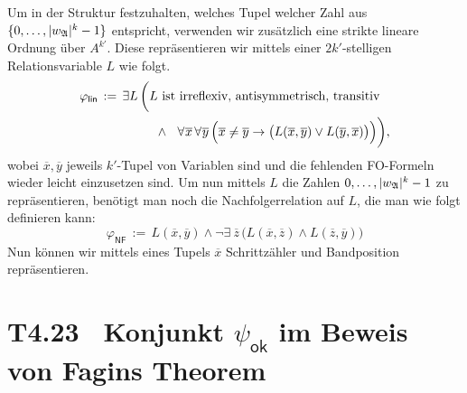 \documentclass[fontsize=11pt, twoside=false, numbers=autoenddot]{scrbook}
\begin{document}
Um in der Struktur festzuhalten, welches Tupel welcher Zahl aus $\{0,\dots,|w_\mathfrak{A}|^k-1\}$
entspricht,
verwenden wir zusätzlich eine strikte lineare Ordnung über $A^{k'}$.
Diese repräsentieren wir mittels einer $2k'$-stelligen Relationsvariable $L$ wie folgt.
%
\begin{align*}
  \varphi_{\textsf{lin}} & \,:=\, \exists L\,\bigg(L \text{~ist irreflexiv, antisymmetrisch, transitiv} \\
                         & \hspace*{16mm} \land~~ \forall\:\!\overline{x}\,\forall\:\!\overline{y}\,
                                          \Big(\overline{x} \neq \overline{y} \to \big(L(\overline{x},\overline{y}) \lor L(\overline{y},\overline{x})\big)\Big)\bigg),
\end{align*}
%
wobei $\overline{x},\overline{y}$ jeweils $k'$-Tupel von Variablen sind
und die fehlenden FO-Formeln wieder leicht einzusetzen sind.
Um nun mittels $L$ die Zahlen $0,\dots,|w_\mathfrak{A}|^k-1$ zu repräsentieren,
benötigt man noch die Nachfolgerrelation auf $L$, die man wie folgt definieren kann:
%
\[
  \varphi_{\textsf{NF}} \,:=\, L(\overline{x},\overline{y}) \land \lnot \exists\:\!\overline{z}\,\big(L(\overline{x},\overline{z}) \land L(\overline{z},\overline{y})\big)
\]
%
Nun können wir mittels eines Tupels $\overline{x}$ Schrittzähler und Bandposition repräsentieren.

\section*{T4.23~ Konjunkt {\boldmath $\psi_{\textsf{ok}}$} im Beweis von Fagins Theorem}
\end{document}
